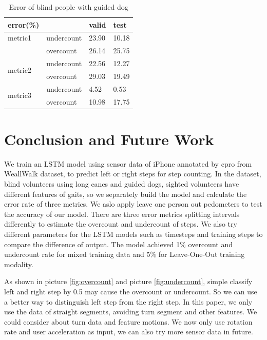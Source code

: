 \documentclass[11pt]{article}
\begin{document}
{\begin{table}[]
\centering
\caption{Error of blind people with guided dog}
\label{my-label}
\begin{tabular}{llll}
\hline
error(\%)                &            & valid & test  \\ \hline
metric1                  & undercount & 23.90 & 10.18 \\
                         & overcount  & 26.14 & 25.75 \\ \hline
\multirow{2}{*}{metric2} & undercount & 22.56 & 12.27 \\
                         & overcount  & 29.03 & 19.49 \\ \hline
\multirow{2}{*}{metric3} & undercount & 4.52  & 0.53  \\
                         & overcount  & 10.98 & 17.75 \\ \hline
\end{tabular}
\end{table}


\section{Conclusion and Future Work}

We train an LSTM model using sensor data of iPhone annotated by cpro from WeallWalk dataset, to predict left or right steps for step counting. In the dataset, blind volunteers using long canes and guided dogs, sighted volunteers have different features of gaits, so we separately build the model and calculate the error rate of three metrics. We aslo apply leave one person out pedometers to test the accuracy of our model. There are three error metrics splitting intervals differently to estimate the overcount and undercount of steps. We also try different parameters for the LSTM models such as timesteps and training steps to compare the difference of output.  The model achieved 1\% overcount and undercount rate for mixed training data and 5\% for Leave-One-Out training modality.

As shown in picture \ref{fig:overcount} and picture \ref{fig:undercount}, simple classify left and right step by 0.5 may cause the overcount or undercount. So we can use a better way to distinguish left step from the right step. In this paper, we only use the data of straight segments, avoiding turn segment and other features. We could consider about turn data and feature motions. We now only use rotation rate and user acceleration as input, we can also try more sensor data in future.

}
\end{document}
